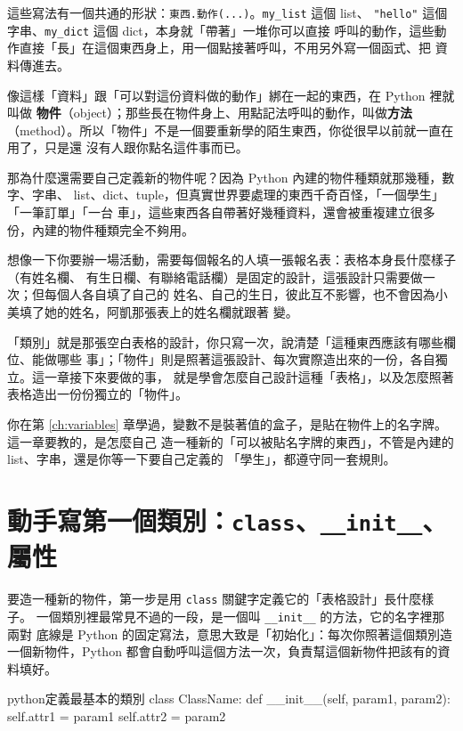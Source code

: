 這些寫法有一個共通的形狀：\texttt{東西.動作(...)}。\texttt{my\_list} 這個 list、
\texttt{"hello"} 這個字串、\texttt{my\_dict} 這個 dict，本身就「帶著」一堆你可以直接
呼叫的動作，這些動作直接「長」在這個東西身上，用一個點接著呼叫，不用另外寫一個函式、把
資料傳進去。

像這樣「資料」跟「可以對這份資料做的動作」綁在一起的東西，在 Python 裡就叫做
\textbf{物件}（object）；那些長在物件身上、用點記法呼叫的動作，叫做\textbf{方法}
（method）。所以「物件」不是一個要重新學的陌生東西，你從很早以前就一直在用了，只是還
沒有人跟你點名這件事而已。

那為什麼還需要自己定義新的物件呢？因為 Python 內建的物件種類就那幾種，數字、字串、
list、dict、tuple，但真實世界要處理的東西千奇百怪，「一個學生」「一筆訂單」「一台
車」，這些東西各自帶著好幾種資料，還會被重複建立很多份，內建的物件種類完全不夠用。

想像一下你要辦一場活動，需要每個報名的人填一張報名表：表格本身長什麼樣子（有姓名欄、
有生日欄、有聯絡電話欄）是固定的設計，這張設計只需要做一次；但每個人各自填了自己的
姓名、自己的生日，彼此互不影響，也不會因為小美填了她的姓名，阿凱那張表上的姓名欄就跟著
變。

「類別」就是那張空白表格的設計，你只寫一次，說清楚「這種東西應該有哪些欄位、能做哪些
事」；「物件」則是照著這張設計、每次實際造出來的一份，各自獨立。這一章接下來要做的事，
就是學會怎麼自己設計這種「表格」，以及怎麼照著表格造出一份份獨立的「物件」。

你在第 \ref{ch:variables} 章學過，變數不是裝著值的盒子，是貼在物件上的名字牌。這一章要教的，是怎麼自己
造一種新的「可以被貼名字牌的東西」，不管是內建的 list、字串，還是你等一下要自己定義的
「學生」，都遵守同一套規則。

\section{動手寫第一個類別：\texttt{class}、\texttt{\_\_init\_\_}、屬性}
\label{sec:class-init}

要造一種新的物件，第一步是用 \texttt{class} 關鍵字定義它的「表格設計」長什麼樣子。
一個類別裡最常見不過的一段，是一個叫 \texttt{\_\_init\_\_} 的方法，它的名字裡那兩對
底線是 Python 的固定寫法，意思大致是「初始化」：每次你照著這個類別造一個新物件，Python
都會自動呼叫這個方法一次，負責幫這個新物件把該有的資料填好。

\begin{code}{python}{定義最基本的類別}
class ClassName:
    def __init__(self, param1, param2):
        self.attr1 = param1
        self.attr2 = param2
\end{code}

